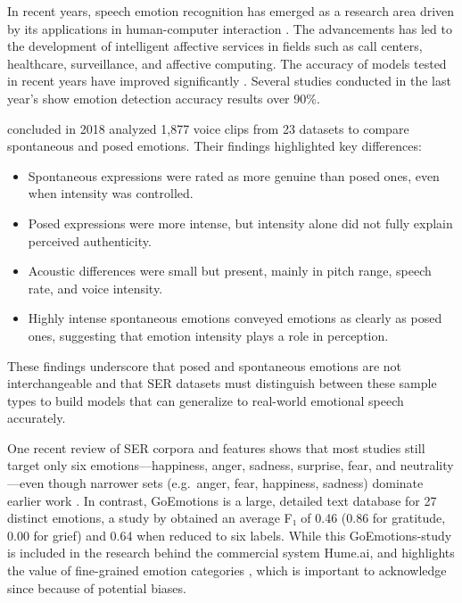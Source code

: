 In recent years, speech emotion recognition has emerged as a research area driven by its applications in human-computer interaction \autocite{Zhang2021}. The advancements has led to the development of intelligent affective services in fields such as call centers, healthcare, surveillance, and affective computing. The accuracy of models tested in recent years have improved significantly \autocite{Adebiyi2024, Praseetha2022, Rahman2024}.  Several studies conducted in the last year’s show emotion detection accuracy results over 90\%. 

\textcite{Juslin2018} concluded in 2018 analyzed 1,877 voice clips from 23 datasets to compare spontaneous and posed emotions. Their findings highlighted key differences: 
\begin{itemize}
    \item Spontaneous expressions were rated as more genuine than posed ones, even when intensity was controlled. 
    \item Posed expressions were more intense, but intensity alone did not fully explain perceived authenticity. 
    \item Acoustic differences were small but present, mainly in pitch range, speech rate, and voice intensity. 
    \item Highly intense spontaneous emotions conveyed emotions as clearly as posed ones, suggesting that emotion intensity plays a role in perception. 
\end{itemize}
These findings underscore that posed and spontaneous emotions are not interchangeable and that SER datasets must distinguish between these sample types to build models that can generalize to real-world emotional speech accurately.  

One recent review of SER corpora and features \autocite{Rathi2024} shows that most studies still target only six emotions—happiness, anger, sadness, surprise, fear, and neutrality—even though narrower sets (e.g.\ anger, fear, happiness, sadness) dominate earlier work \autocite{Scherer2018}. In contrast, GoEmotions is a large, detailed text database for 27 distinct emotions, a study by \textcite{Demszky2020} obtained an average F₁ of 0.46 (0.86 for gratitude, 0.00 for grief) and 0.64 when reduced to six labels. While this GoEmotions-study is included in the research behind the commercial system Hume.ai, and highlights the value of fine-grained emotion categories \autocite{HumeAI-AboutHume}, which is important to acknowledge since because of potential biases.  

